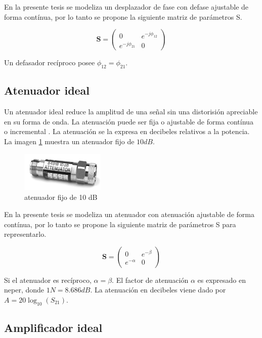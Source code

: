 En la presente tesis se modeliza un desplazador de fase con defase ajustable de forma contínua, por lo tanto se propone la 
siguiente matriz de parámetros S.

$$
\mathbf{S} = \begin{pmatrix} 0 & e^{-j\phi_{12}}\\e^{-j\phi_{21}} & 0\end{pmatrix}
$$

Un defasador recíproco posee $\phi_{12} = \phi_{21}$.

\subsection{Atenuador ideal}

Un atenuador ideal reduce la amplitud de una señal sin una distorisión apreciable en su forma de onda. La atenuación puede ser
fija o ajustable de forma contínua o incremental \cite{Standard1996}. La atenuación se la expresa en decibeles relativos a la
potencia. La imagen \ref{fig:attenuator} muestra un atenuador fijo de $10 dB$.

\begin{figure}[H]
 \centering
 \includegraphics[width=4cm]{gfx/attenuator.png}
 \caption{atenuador fijo de 10 dB \cite{Keysight2014}}
 \label{fig:attenuator}
\end{figure}

En la presente tesis se modeliza un atenuador con atenuación ajustable de forma contínua, por lo tanto se propone la siguiente
matriz de parámetros S para representarlo.

$$
\mathbf{S} = \begin{pmatrix} 0 & e^{-\beta}\\e^{-\alpha} & 0\end{pmatrix}
$$

Si el atenuador es recíproco, $\alpha = \beta$. El factor de atenuación $\alpha$ es expresado en neper, donde $1N = 8.686dB$.
La atenuación en decibeles viene dado por $A = 20\log_{10}(S_{21})$. 


\subsection{Amplificador ideal}

